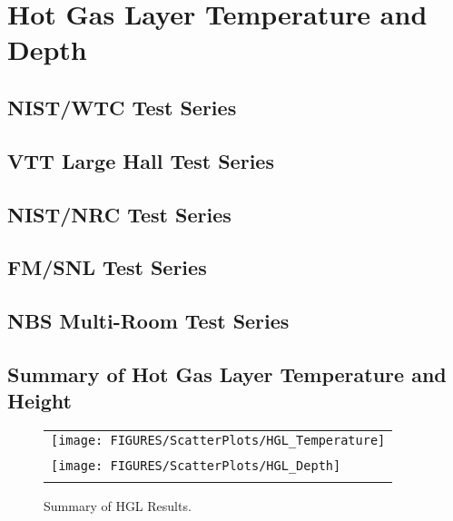 \chapter{Hot Gas Layer Temperature and Depth}




\section{NIST/WTC Test Series}




\section{VTT Large Hall Test Series}







\section{NIST/NRC Test Series}





\section{FM/SNL Test Series}





\section{NBS Multi-Room Test Series}




\section{Summary of Hot Gas Layer Temperature and Height}

\begin{figure}[p]
\begin{center}
\begin{tabular}{l}
\texttt{[image: FIGURES/ScatterPlots/HGL\_Temperature]} \\
\vspace{0.25in} \\
\texttt{[image: FIGURES/ScatterPlots/HGL\_Depth]} \\
\vspace{0.25in}
\end{tabular}
\caption{Summary of HGL Results.}
\end{center}
\end{figure}
